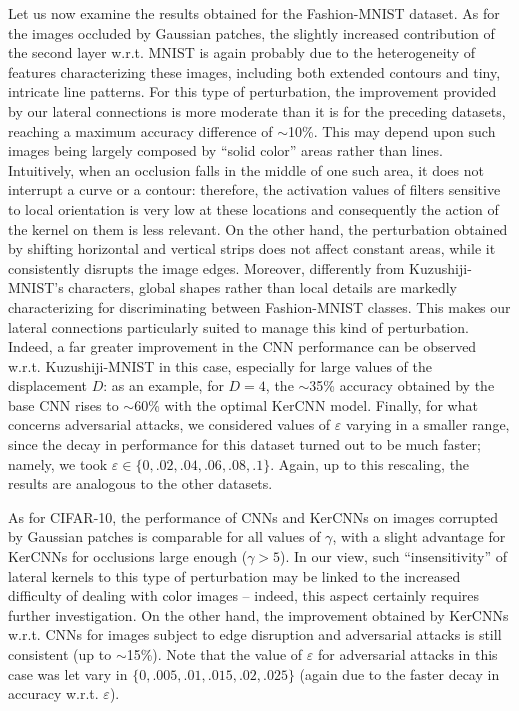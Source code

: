 \documentclass[11pt,oneside,reqno]{amsart}
\begin{document}
 Let us now examine the results obtained for the Fashion-MNIST dataset. As for the images occluded by Gaussian patches, the slightly increased contribution of the second layer w.r.t. MNIST is again probably due to the heterogeneity of features characterizing these images, including both extended contours and tiny, intricate line patterns. For this type of perturbation, the improvement provided by our lateral connections is more moderate than it is for the preceding datasets, reaching a maximum accuracy difference of $\sim$10\%. This may depend upon such images being largely composed by ``solid color'' areas rather than lines. Intuitively, when an occlusion falls in the middle of one such area, it does not interrupt a curve or a contour: therefore, the activation values of filters sensitive to local orientation is very low at these locations and consequently the action of the kernel on them is less relevant. On the other hand, the perturbation obtained by shifting horizontal and vertical strips does not affect constant areas, while it consistently disrupts the image edges. Moreover, differently from Kuzushiji-MNIST's characters, global shapes rather than local details are markedly characterizing for discriminating between Fashion-MNIST classes. This makes our lateral connections particularly suited to manage this kind of perturbation. Indeed, a far greater improvement in the CNN performance can be observed w.r.t. Kuzushiji-MNIST in this case, especially for large values of the displacement $D$: as an example, for $D=4$, the $\sim$35\% accuracy obtained by the base CNN rises to $\sim$60\% with the optimal KerCNN model. Finally, for what concerns adversarial attacks, we considered values of $\varepsilon$ varying in a smaller range, since the decay in performance for this dataset turned out to be much faster; namely, we took $\varepsilon \in \{0,.02,.04,.06,.08,.1\}$. Again, up to this rescaling, the results are analogous to the other datasets.
 
 As for CIFAR-10, the performance of CNNs and KerCNNs on images corrupted by Gaussian patches is comparable for all values of $\gamma$, with a slight advantage for KerCNNs for occlusions large enough ($\gamma>5$). In our view, such ``insensitivity'' of lateral kernels to this type of perturbation may be linked to the increased difficulty of dealing with color images -- indeed, this aspect certainly requires further investigation. On the other hand, the improvement obtained by KerCNNs w.r.t. CNNs for images subject to edge disruption and adversarial attacks is still consistent (up to $\sim$15\%). Note that the value of $\varepsilon$ for adversarial attacks in this case was let vary in $\{0,.005,.01,.015,.02,.025\}$ (again due to the faster decay in accuracy w.r.t. $\varepsilon$). 
 
\end{document}
